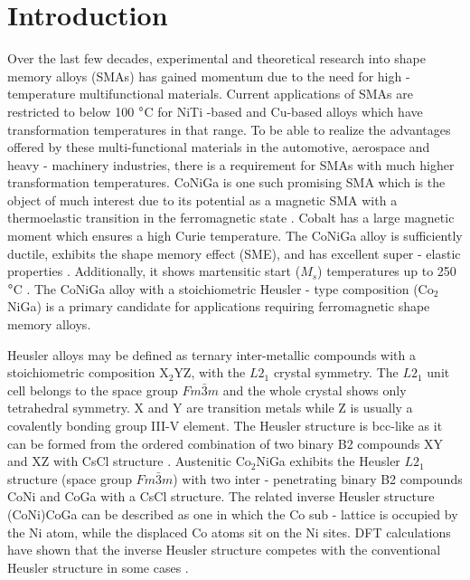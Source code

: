 \documentclass[%
preprint,
 amsmath,amssymb,
 aps,
prb,
showkeys,
]{revtex4-1}
\begin{document}
	\maketitle
\section{Introduction}
\label{Sec:intro}

Over the last few decades, experimental and theoretical research into shape memory alloys (SMAs) has gained momentum due to the need for high - temperature multifunctional materials. Current  applications of SMAs are restricted to below 100 $\degree$C for NiTi -based  and Cu-based alloys  which have transformation temperatures in that range.  To be able to realize the advantages offered by these multi-functional materials in the automotive, aerospace and heavy - machinery industries, there is a requirement for  SMAs with much higher transformation temperatures. CoNiGa is one such promising SMA which is the object of much interest due to its potential as a  magnetic SMA with a thermoelastic transition in the ferromagnetic state \cite{siewert2010electronic}. Cobalt has a large magnetic moment which ensures a high Curie temperature. The CoNiGa alloy is sufficiently ductile, exhibits the shape memory effect (SME), and has excellent super - elastic properties \cite{dai2005superelasticity}.  Additionally, it shows martensitic start ($M_s$) temperatures up to 250 $\degree$C \cite{liu2006effect}.
The CoNiGa alloy with a stoichiometric Heusler - type composition (Co$_2$NiGa) is a primary candidate for applications requiring ferromagnetic shape memory alloys\cite{dogan2011microstructure,canadinc2007role,oikawa2001promising,murakami2002magnetic}.

Heusler alloys may be defined as ternary inter-metallic compounds with a stoichiometric composition X$_2$YZ, with the $L2_1$ crystal symmetry. The $L2_1$ unit cell belongs to the space group $Fm\bar{3}m$ and the whole crystal shows only tetrahedral symmetry. X and Y are transition metals while Z is usually a covalently bonding group III-V element. The Heusler structure is bcc-like as it can be formed from the ordered combination of two binary B2
compounds XY and XZ with CsCl structure \cite{dannenberg2011ab}.
Austenitic Co$_2$NiGa exhibits the Heusler $L2_1$ structure (space group $Fm\bar{3}m$) with two inter - penetrating binary B2 compounds CoNi and CoGa with a CsCl structure. The related inverse Heusler structure (CoNi)CoGa can be described as one in which the Co sub - lattice is occupied by the Ni atom, while the displaced Co atoms sit on the Ni sites. DFT calculations have shown that the inverse Heusler structure competes with the conventional Heusler structure in some cases \cite{yamada2014synthesis}. 
\end{document}
